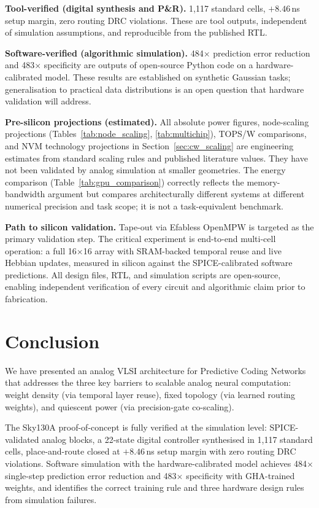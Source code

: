 \documentclass[journal,10pt,twoside]{IEEEtran}
\begin{document}
\textbf{Tool-verified (digital synthesis and P\&R).}
1,117 standard cells, $+8.46$\,ns setup margin, zero routing DRC violations.
These are tool outputs, independent of simulation assumptions, and
reproducible from the published RTL.

\textbf{Software-verified (algorithmic simulation).}
484$\times$ prediction error reduction and 483$\times$ specificity are
outputs of open-source Python code on a hardware-calibrated model.
These results are established on synthetic Gaussian tasks;
generalisation to practical data distributions is an open question
that hardware validation will address.

\textbf{Pre-silicon projections (estimated).}
All absolute power figures, node-scaling projections (Tables~\ref{tab:node_scaling},
\ref{tab:multichip}), TOPS/W comparisons, and NVM technology projections
in Section~\ref{sec:cw_scaling} are engineering estimates from
standard scaling rules and published literature values.
They have not been validated by analog simulation at smaller geometries.
The energy comparison (Table~\ref{tab:gpu_comparison}) correctly reflects
the memory-bandwidth argument but compares architecturally different systems
at different numerical precision and task scope; it is not a
task-equivalent benchmark.

\textbf{Path to silicon validation.}
Tape-out via Efabless OpenMPW is targeted as the primary validation step.
The critical experiment is end-to-end multi-cell operation: a full
16$\times$16 array with SRAM-backed temporal reuse and live Hebbian updates,
measured in silicon against the SPICE-calibrated software predictions.
All design files, RTL, and simulation scripts are open-source, enabling
independent verification of every circuit and algorithmic claim prior to
fabrication.

\section{Conclusion}
\label{sec:conclusion}

We have presented an analog VLSI architecture for Predictive Coding Networks
that addresses the three key barriers to scalable analog neural computation:
weight density (via temporal layer reuse), fixed topology (via learned
routing weights), and quiescent power (via precision-gate co-scaling).

The Sky130A proof-of-concept is fully verified at the simulation level:
SPICE-validated analog blocks, a 22-state digital controller synthesised in
1,117 standard cells, place-and-route closed at $+8.46$\,ns setup margin
with zero routing DRC violations.
Software simulation with the hardware-calibrated model achieves
484$\times$ single-step prediction error reduction and 483$\times$
specificity with GHA-trained weights, and identifies the correct training
rule and three hardware design rules from simulation failures.
\end{document}
